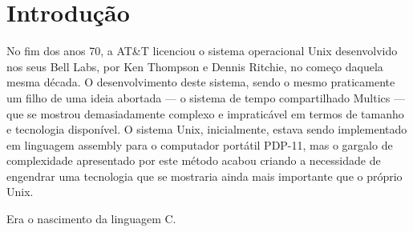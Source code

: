 \documentclass[
	12pt,				%
	openright,			%
	twoside,			%
	a4paper,			%
	english,			%
	french,				%
	spanish,			%
	brazil				%
	]{abntex2}
\begin{document}

\frenchspacing 


\imprimircapa

\imprimirfolhaderosto*

\begin{fichacatalografica}
	\sffamily
	\vspace*{\fill}					%
	\begin{center}					%
	\end{center}
\end{fichacatalografica}

\chapter{Introdução}

No fim dos anos 70, a AT\&T licenciou o sistema operacional Unix desenvolvido nos seus Bell Labs, por Ken Thompson e Dennis Ritchie, no começo daquela mesma década. O desenvolvimento deste sistema, sendo o mesmo praticamente um filho de uma ideia abortada --- o sistema de tempo compartilhado Multics --- que se mostrou demasiadamente complexo e impraticável em termos de tamanho e tecnologia disponível. O sistema Unix, inicialmente, estava sendo implementado em linguagem assembly para o computador portátil PDP-11, mas o gargalo de complexidade apresentado por este método acabou criando a necessidade de engendrar uma tecnologia que se mostraria ainda mais importante que o próprio Unix. \par 
Era o nascimento da linguagem C.
\end{document}
